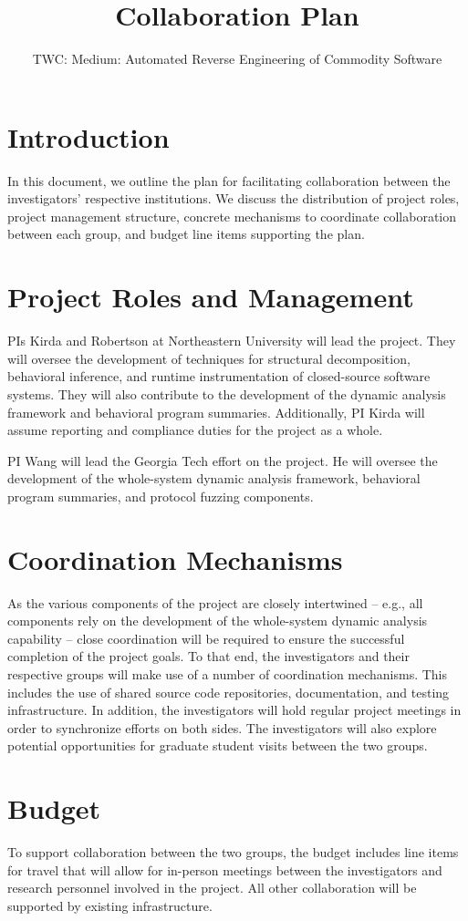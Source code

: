 \documentclass[letterpaper,11pt]{scrartcl}
\newcommand{\thetitle}{TWC: Medium: Automated Reverse Engineering of Commodity Software\xspace}
\begin{document}
\title{Collaboration Plan}
\subtitle{\thetitle}
\author{}
\date{}
\maketitle

\section{Introduction}
\label{sec:introduction}

In this document, we outline the plan for facilitating collaboration between
the investigators' respective institutions.  We discuss the distribution of
project roles, project management structure, concrete mechanisms to coordinate
collaboration between each group, and budget line items supporting the plan.

\section{Project Roles and Management}
\label{sec:roles}

PIs Kirda and Robertson at Northeastern University will lead the project. They
will oversee the development of techniques for structural decomposition,
behavioral inference, and runtime instrumentation of closed-source software
systems.  They will also contribute to the development of the dynamic analysis
framework and behavioral program summaries.  Additionally, PI Kirda will
assume reporting and compliance duties for the project as a whole.

PI Wang will lead the Georgia Tech effort on the project.  He will oversee the
development of the whole-system dynamic analysis framework, behavioral program
summaries, and protocol fuzzing components.

\section{Coordination Mechanisms}
\label{sec:coordination}

As the various components of the project are closely intertwined -- e.g., all
components rely on the development of the whole-system dynamic analysis
capability -- close coordination will be required to ensure the successful
completion of the project goals.  To that end, the investigators and their
respective groups will make use of a number of coordination mechanisms.  This
includes the use of shared source code repositories, documentation, and
testing infrastructure.  In addition, the investigators will hold regular
project meetings  in order to synchronize efforts on both sides.  The
investigators will also explore potential opportunities for graduate student
visits between the two groups.

\section{Budget}
\label{sec:budget}

To support collaboration between the two groups, the budget includes line
items for travel that will allow for in-person meetings between the
investigators and research personnel involved in the project.  All other
collaboration will be supported by existing infrastructure.
\end{document}
